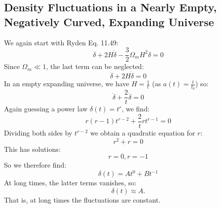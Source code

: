 \subsection{Density Fluctuations in a Nearly Empty, Negatively Curved, Expanding Universe}
We again start with Ryden Eq. 11.49:
\begin{equation}
    \ddot{\delta} + 2H\dot{\delta} - \frac{3}{2}\Omega_m H^2\delta = 0
\end{equation}
Since $\Omega_m \ll 1$, the last term can be neglected:
\begin{equation}
    \ddot{\delta} + 2H\dot{\delta} = 0
\end{equation}
In an empty expanding universe, we have $H = \frac{1}{t}$ (as $a(t) = \frac{t}{t_0}$) so:
\begin{equation}
    \ddot{\delta} + \frac{2}{t}\dot{\delta} = 0
\end{equation}
Again guessing a power law $\delta(t) = t^r$, we find:
\begin{equation}
    r(r-1)t^{r-2} + \frac{2}{t}rt^{r-1} = 0
\end{equation}
Dividing both sides by $t^{r-2}$ we obtain a quadratic equation for $r$:
\begin{equation}
    r^2 + r = 0
\end{equation}
This has solutions:
\begin{equation}
    r = 0, r = -1
\end{equation}
So we therefore find:
\begin{equation}
    \boxed{\delta(t) = At^0 + Bt^{-1}}
\end{equation}
At long times, the latter terms vanishes, so:
\begin{equation}
    \boxed{\delta(t) \approx A}.
\end{equation}
That is, at long times the fluctuations are constant.

